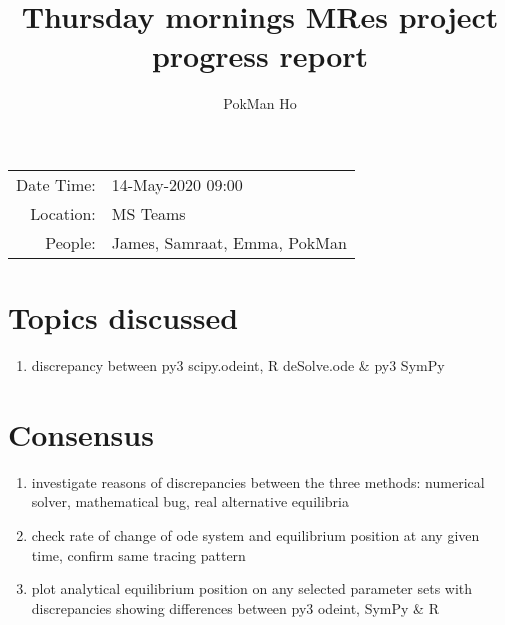 \documentclass[a4paper,11pt]{article}
\title{Thursday mornings MRes project progress report}
\author{PokMan Ho}
\date{}
\begin{document}
    \maketitle
    
    \begin{tabular}{rl}
        Date Time: & 14-May-2020 09:00 \\
        Location: & MS Teams \\
        People: & James, Samraat, Emma, PokMan \\
    \end{tabular}
    
    \section{Topics discussed}
    \begin{enumerate}
        \item discrepancy between py3 scipy.odeint, R deSolve.ode \& py3 SymPy
    \end{enumerate}
    
    \section{Consensus}
    \begin{enumerate}
        \item investigate reasons of discrepancies between the three methods: numerical solver, mathematical bug, real alternative equilibria
        \item check rate of change of ode system and equilibrium position at any given time, confirm same tracing pattern
        \item plot analytical equilibrium position on any selected parameter sets with discrepancies showing differences between py3 odeint, SymPy \& R
    \end{enumerate}
\end{document}
